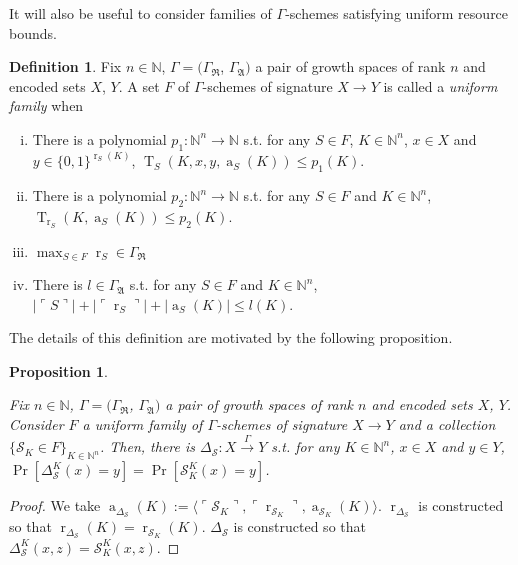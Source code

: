 \documentclass{article}
\numberwithin{equation}{section}
\theoremstyle{definition}
\newtheorem{definition}{Definition}[section]
\theoremstyle{plain}
\newtheorem{proposition}{Proposition}[section]
\newcommand{\Bool}{\{0,1\}}
\newcommand{\WordsLen}[1]{{\Bool^{#1}}}
\DeclareMathOperator{\T}{T}
\DeclareMathOperator{\R}{r}
\DeclareMathOperator{\A}{a}
\newcommand{\Nats}{\mathbb{N}}
\newcommand{\Abs}[1]{\lvert #1 \rvert}
\newcommand{\Chev}[1]{\langle #1 \rangle}
\newcommand{\Quote}[1]{\ulcorner #1 \urcorner}
\newcommand{\GrowR}{\Gamma_{\mathfrak{R}}}
\newcommand{\GrowA}{\Gamma_{\mathfrak{A}}}
\begin{document}
It will also be useful to consider families of $\Gamma$-schemes satisfying uniform resource bounds.

\begin{definition}

Fix $n \in \Nats$, $\Gamma=(\GrowR$, $\GrowA)$ a pair of growth spaces of rank $n$ and encoded sets $X$, $Y$. A set $F$ of $\Gamma$-schemes of signature $X \rightarrow Y$ is called a \emph{uniform family} when

\begin{enumerate}[(i)]

\item There is a polynomial $p_1: \Nats^n \rightarrow \Nats$ s.t. for any $S \in F$, $K \in \Nats^n$, $x \in X$ and $y \in \WordsLen{\R_S(K)}$, $\T_S(K,x,y,\A_S(K)) \leq p_1(K)$.

\item There is a polynomial $p_2: \Nats^n \rightarrow \Nats$ s.t. for any $S \in F$ and $K \in \Nats^n$, $\T_{\R_S}(K,\A_S(K)) \leq p_2(K)$.

\item $\max_{S \in F} \R_S \in \GrowR$

\item There is $l \in \GrowA$ s.t. for any $S \in F$ and $K \in \Nats^n$, ${\Abs{\Quote{S}} + \Abs{\Quote{\R_S}} + \Abs{\A_S(K)} \leq l(K)}$.

\end{enumerate}

\end{definition}

The details of this definition are motivated by the following proposition.

\begin{proposition}
\label{prp:fam_diag}

Fix $n \in \Nats$, $\Gamma=(\GrowR$, $\GrowA)$ a pair of growth spaces of rank $n$ and encoded sets $X$, $Y$. Consider $F$ a uniform family of $\Gamma$-schemes of signature $X \rightarrow Y$ and a collection $\{\mathcal{S}_K \in F\}_{K \in \Nats^n}$. Then, there is $\Delta_\mathcal{S}: X \xrightarrow{
\Gamma} Y$ s.t. for any $K \in \Nats^n$, $x \in X$ and $y \in Y$, $\Pr[\Delta_\mathcal{S}^K(x)=y] = \Pr[\mathcal{S}_K^K(x)=y]$.

\end{proposition}

\begin{proof}

We take $\A_{\Delta_{\mathcal{S}}}(K):=\Chev{\Quote{\mathcal{S}_K},\Quote{\R_{\mathcal{S}_K}},\A_{\mathcal{S}_K}(K)}$. $\R_{\Delta_{\mathcal{S}}}$ is constructed so that $\R_{\Delta_{\mathcal{S}}}(K)=\R_{\mathcal{S}_K}(K)$. $\Delta_{\mathcal{S}}$ is constructed so that $\Delta_{\mathcal{S}}^K(x,z)=\mathcal{S}_K^K(x,z)$.
\end{proof}
\end{document}
